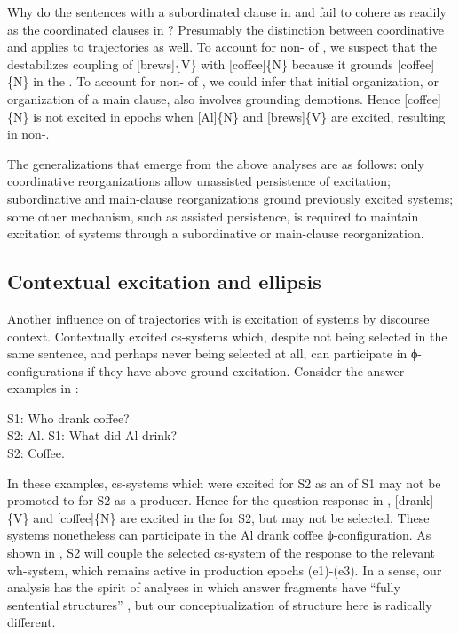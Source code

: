   Why do the sentences with a subordinated clause in  and  fail to cohere as readily as the coordinated clauses in ? Presumably the distinction between coordinative and  applies to  trajectories as well. To account for non- of , we suspect that the  destabilizes coupling of [brews]\{V\} with [coffee]\{N\} because it grounds [coffee]\{N\} in the . To account for non- of , we could infer that initial organization, or organization of a main clause, also involves grounding demotions. Hence [coffee]\{N\} is not excited in epochs when [Al]\{N\} and [brews]\{V\} are excited, resulting in non-. 

  The generalizations that emerge from the above analyses are as follows: only coordinative reorganizations allow unassisted persistence of excitation; subordinative and main-clause reorganizations ground previously excited systems; some other mechanism, such as assisted persistence, is required to maintain excitation of systems through a subordinative or main-clause reorganization. 

\subsection{Contextual excitation and ellipsis}

Another influence on  of trajectories with  is excitation of systems by discourse context. Contextually excited cs-systems which, despite not being selected in the same sentence, and perhaps never being selected at all, can participate in ϕ-configurations if they have above-ground excitation. Consider the answer  examples in :

\ea\label{ex:7:8}
    \ea S1: {Who drank coffee?}\\  S2: {Al}.\label{ex:7:8a}
    \ex S1: {What did Al drink?}\\  S2: {Coffee.}\label{ex:7:8b}
\z
\z

  In these examples, cs-systems which were excited for S2 as an  of S1 may not be promoted to  for S2 as a producer. Hence for the question response in , [drank]\{V\} and [coffee]\{N\} are excited in the  for S2, but may not be selected. These systems nonetheless can participate in the {\textbar}Al drank coffee{\textbar} ϕ-configuration. As shown in {}, S2 will couple the selected cs-system of the response to the relevant wh-system, which remains active in production epochs (e1)-(e3). In a sense, our analysis has the spirit of analyses in which answer fragments have “fully sentential structures”  \citep{Merchant2005}, but our conceptualization of structure here is radically different.

